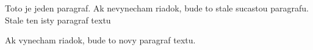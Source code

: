 \documentclass{book}
\begin{document}
Toto je jeden paragraf.
Ak nevynecham riadok, bude to stale sucastou paragrafu. 
Stale ten isty paragraf textu

Ak vynecham riadok, bude to novy paragraf textu.
\end{document}
